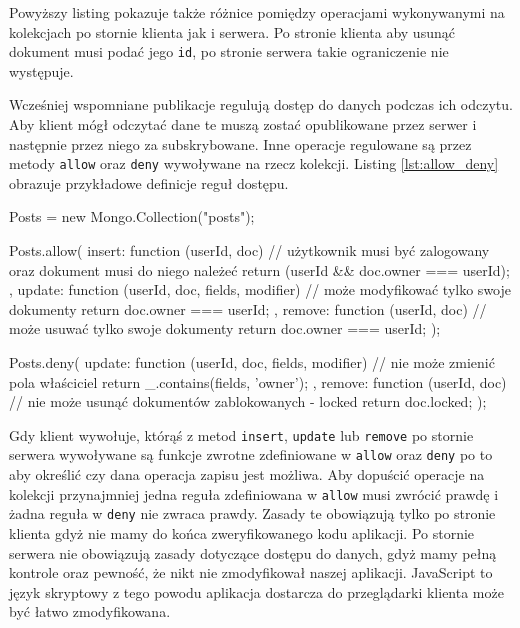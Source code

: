 Powyższy listing pokazuje także różnice pomiędzy operacjami wykonywanymi na kolekcjach po stornie klienta jak i serwera. Po stronie klienta aby usunąć dokument musi podać jego \verb|id|, po stronie serwera takie ograniczenie nie występuje. 

Wcześniej wspomniane publikacje regulują dostęp do danych podczas ich odczytu. Aby klient mógł odczytać dane te muszą zostać opublikowane przez serwer i następnie przez niego za subskrybowane. Inne operacje regulowane są przez metody \verb|allow| oraz \verb|deny| wywoływane na rzecz kolekcji. Listing \ref{lst:allow_deny} obrazuje przykładowe definicje reguł dostępu.
\begin{js}[caption={{Definicje \textit{allow} oraz \textit{deny}}},label={lst:allow_deny}]
Posts = new Mongo.Collection("posts");

Posts.allow({
  insert: function (userId, doc) {
    // użytkownik musi być zalogowany oraz dokument musi do niego należeć
    return (userId && doc.owner === userId);
  },
  update: function (userId, doc, fields, modifier) {
    // może modyfikować tylko swoje dokumenty
    return doc.owner === userId;
  },
  remove: function (userId, doc) {
    // może usuwać tylko swoje dokumenty
    return doc.owner === userId;
  }
});

Posts.deny({
  update: function (userId, doc, fields, modifier) {
    // nie może zmienić pola właściciel
    return _.contains(fields, 'owner');
  },
  remove: function (userId, doc) {
    // nie może usunąć dokumentów zablokowanych - locked
    return doc.locked;
  }
});
\end{js}

Gdy klient wywołuje, którąś z metod \verb|insert|, \verb|update| lub \verb|remove| po stornie serwera wywoływane są funkcje zwrotne zdefiniowane w \verb|allow| oraz \verb|deny| po to aby określić czy dana operacja zapisu jest możliwa. Aby dopuścić operacje na kolekcji przynajmniej jedna reguła zdefiniowana w \verb|allow| musi zwrócić prawdę i żadna reguła w \verb|deny| nie zwraca prawdy. Zasady te obowiązują tylko po stronie klienta gdyż nie mamy do końca zweryfikowanego kodu aplikacji. Po stornie serwera nie obowiązują zasady dotyczące dostępu do danych, gdyż mamy pełną kontrole oraz pewność, że nikt nie zmodyfikował naszej aplikacji. JavaScript to język skryptowy z tego powodu aplikacja dostarcza do przeglądarki klienta może być łatwo zmodyfikowana. 

